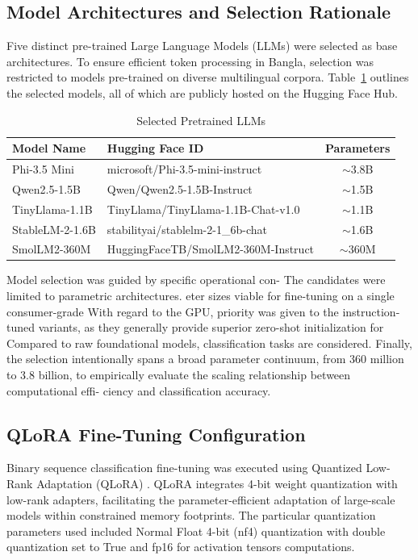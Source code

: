 \documentclass[journal]{IEEEtran}
\begin{document}
\subsection{Model Architectures and Selection Rationale}

Five distinct pre-trained Large Language Models (LLMs) were selected as base architectures. To ensure efficient token processing in Bangla, selection was restricted to models pre-trained on diverse multilingual corpora. Table~\ref{tab:models} outlines the selected models, all of which are publicly hosted on the Hugging Face Hub.

\begin{table}[htbp]
\caption{Selected Pretrained LLMs}
\label{tab:models}
\centering
\begin{tabular}{llc}
\toprule
\textbf{Model Name} & \textbf{Hugging Face ID} & \textbf{Parameters} \\
\midrule
Phi-3.5 Mini & microsoft/Phi-3.5-mini-instruct & $\sim$3.8B \\
Qwen2.5-1.5B & Qwen/Qwen2.5-1.5B-Instruct & $\sim$1.5B \\
TinyLlama-1.1B & TinyLlama/TinyLlama-1.1B-Chat-v1.0 & $\sim$1.1B \\
StableLM-2-1.6B & stabilityai/stablelm-2-1\_6b-chat & $\sim$1.6B \\
SmolLM2-360M & HuggingFaceTB/SmolLM2-360M-Instruct & $\sim$360M \\
\bottomrule
\end{tabular}
\end{table}

Model selection was guided by specific operational con-
The candidates were limited to parametric architectures.
eter sizes viable for fine-tuning on a single consumer-grade
With regard to the GPU, priority was given to the instruction-tuned variants, as
they generally provide superior zero-shot initialization for
Compared to raw foundational models, classification tasks are considered.
Finally, the selection intentionally spans a broad parameter
continuum, from 360 million to 3.8 billion, to empirically
evaluate the scaling relationship between computational effi-
ciency and classification accuracy.

\subsection{QLoRA Fine-Tuning Configuration}

Binary sequence classification fine-tuning was executed using Quantized Low-Rank Adaptation (QLoRA) \cite{ref11}. QLoRA integrates 4-bit weight quantization with low-rank adapters, facilitating the parameter-efficient adaptation of large-scale models within constrained memory footprints. The
particular quantization parameters used included Normal Float 4-bit
(nf4) quantization with double quantization set to True and fp16 for
activation tensors computations.
\end{document}
